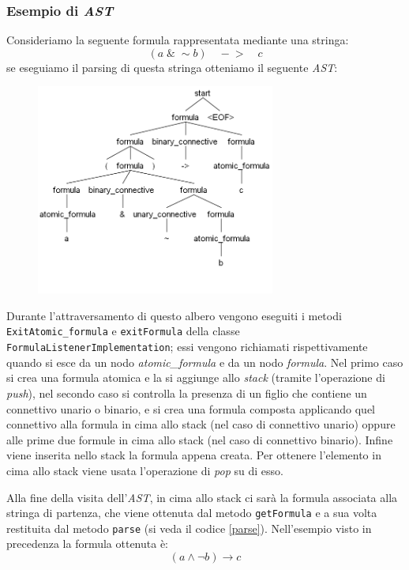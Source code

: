 \documentclass[a4paper,12pt]{report}
\begin{document}
\subsubsection{Esempio di \emph{AST}}
Consideriamo la seguente formula rappresentata mediante una stringa:
\[ (a \; \& \; \sim\!b) \quad -\!> \quad c \]
se eseguiamo il parsing di questa stringa otteniamo il seguente \emph{AST}:
\begin{figure}[H]
    \includegraphics[width=0.7\textwidth, height=0.5\textheight]{img/antlr4_parse_tree.png}
\end{figure}
\noindent Durante l'attraversamento di questo albero vengono eseguiti i metodi \\ \texttt{ExitAtomic\_formula} e \texttt{exitFormula} della classe \texttt{FormulaListenerImplementation}; essi vengono richiamati rispettivamente quando si esce da un nodo \emph{atomic\_formula} e da un nodo \emph{formula}. Nel primo caso si crea una formula atomica e la si aggiunge allo \emph{stack} (tramite l'operazione di \emph{push}), nel secondo caso si controlla la presenza di un figlio che contiene un connettivo unario o binario, e si crea una formula composta applicando quel connettivo alla formula in cima allo stack (nel caso di connettivo unario) oppure alle prime due formule in cima allo stack (nel caso di connettivo binario). Infine viene inserita nello stack la formula appena creata. Per ottenere l'elemento in cima allo stack viene usata l'operazione di \emph{pop} su di esso.

Alla fine della visita dell'\emph{AST}, in cima allo stack ci sarà la formula associata alla stringa di partenza, che viene ottenuta dal metodo \texttt{getFormula} e a sua volta restituita dal metodo \texttt{parse} (si veda il codice \ref{parse}). Nell'esempio visto in precedenza la formula ottenuta è:
\[ (a \land \lnot b) \to c \]
\end{document}
